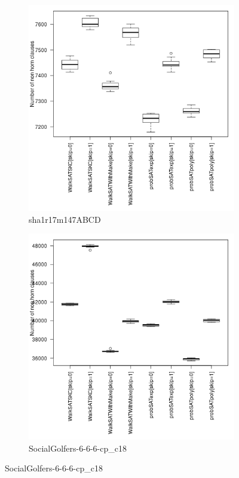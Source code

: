 \documentclass[12pt,a4paper]{article}
\begin{document}
\begin{figure}[H]\ContinuedFloat
  \centering  
  \begin{subfigure}{0.4\textwidth}
    \includegraphics[width=\textwidth]{boxplots/boxPlotsha1r17m147ABCD.png}
    \caption{sha1r17m147ABCD}
  \end{subfigure}
  \begin{subfigure}{0.4\textwidth}
    \includegraphics[width=\textwidth]{boxplots/boxPlotSocialGolfers-6-6-6-cp_c18.png}
    \caption{SocialGolfers-6-6-6-cp\_c18}
  \end{subfigure}


\end{figure}
\end{document}
